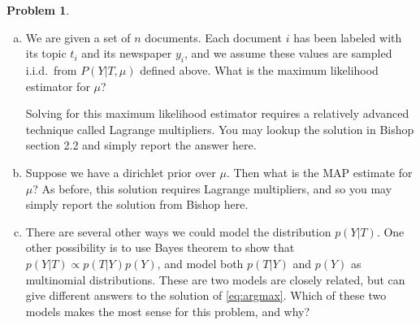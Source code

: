 \documentclass[10pt]{article}
\theoremstyle{definition}
\newtheorem{problem}{Problem}
\begin{document}
\begin{problem}
    \begin{enumerate}[(a)]
        \item 
            We are given a set of $n$ documents.
            Each document $i$ has been labeled with its topic $t_i$ and its newspaper $y_i$,
            and we assume these values are sampled i.i.d.\ from $P(Y|T,\mu)$ defined above.
            What is the maximum likelihood estimator for $\mu$?

            Solving for this maximum likelihood estimator requires a relatively advanced technique called Lagrange multipliers.
            You may lookup the solution in Bishop section 2.2 and simply report the answer here.

        \newpage
        \item 
            Suppose we have a dirichlet prior over $\mu$.
            Then what is the MAP estimate for $\mu$?
            As before, this solution requires Lagrange multipliers, 
            and so you may simply report the solution from Bishop here.

        \vspace{4in}
        \item
            There are several other ways we could model the distribution $p(Y|T)$.
            One other possibility is to use Bayes theorem to show that $p(Y|T)\propto p(T|Y)p(Y)$,
            and model both $p(T|Y)$ and $p(Y)$ as multinomial distributions. 
            These are two models are closely related, 
            but can give different answers to the solution of \eqref{eq:argmax}.
            Which  of these two models makes the most sense for this problem, and why?
    \end{enumerate}

\end{problem}
\end{document}
